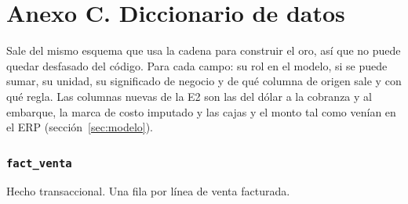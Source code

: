 
\section*{Anexo C. Diccionario de datos}

Sale del mismo esquema que usa la cadena para construir el oro, así que no puede quedar desfasado del código. Para cada campo: su rol en el modelo, si se puede sumar, su unidad, su significado de negocio y de qué columna de origen sale y con qué regla. Las columnas nuevas de la E2 son las del dólar a la cobranza y al embarque, la marca de costo imputado y las cajas y el monto tal como venían en el ERP (sección~\ref{sec:modelo}).

\subsubsection*{\texttt{fact\_venta}}
Hecho transaccional. Una fila por línea de venta facturada.

